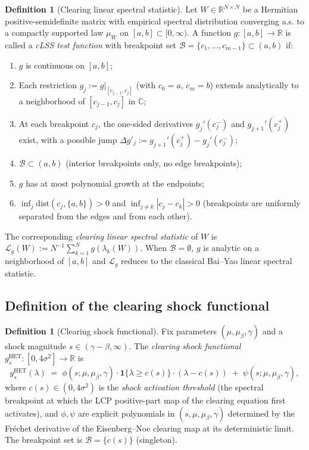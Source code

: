 \documentclass[11pt,a4paper]{article}
\theoremstyle{definition}
\newtheorem{definition}[theorem]{Definition}
\newcommand{\Lcal}{\mathcal{L}}
\newcommand{\Bcal}{\mathcal{B}}
\newcommand{\HET}{\mathrm{HET}}
\newcommand{\indic}{\mathbf{1}}
\begin{document}
\begin{definition}[Clearing linear spectral statistic]
\label{def:cLSS}
Let $W\in\mathbb{R}^{N\times N}$ be a Hermitian positive-semidefinite matrix
with empirical spectral distribution converging a.s. to a compactly supported
law $\mu_W$ on $[a,b]\subset[0,\infty)$. A function $g:[a,b]\to\mathbb{R}$ is
called a \emph{cLSS test function} with breakpoint set
$\Bcal = \{c_1,\dots,c_{m-1}\}\subset(a,b)$ if:
\begin{enumerate}[label={\rm(C\arabic*)},leftmargin=2em]
\item $g$ is continuous on $[a,b]$;
\item Each restriction $g_j := g|_{[c_{j-1},c_j]}$ (with $c_0 = a$, $c_m = b$)
   extends analytically to a neighborhood of $[c_{j-1},c_j]$ in $\mathbb{C}$;
\item At each breakpoint $c_j$, the one-sided derivatives
   $g_j'(c_j^-)$ and $g_{j+1}'(c_j^+)$ exist, with a possible jump
   $\Delta g'_j := g_{j+1}'(c_j^+) - g_j'(c_j^-)$;
\item $\Bcal\subset(a,b)$ (interior breakpoints only, no edge breakpoints);
\item $g$ has at most polynomial growth at the endpoints;
\item $\inf_{j}\mathrm{dist}(c_j,\{a,b\})>0$ and
   $\inf_{j\neq k}|c_j - c_k|>0$ (breakpoints are uniformly separated from
   the edges and from each other).
\end{enumerate}
The corresponding \emph{clearing linear spectral statistic} of $W$ is
$\Lcal_g(W) := N^{-1}\sum_{k=1}^N g(\lambda_k(W))$. When $\Bcal = \emptyset$,
$g$ is analytic on a neighborhood of $[a,b]$ and $\Lcal_g$ reduces to the
classical Bai--Yao linear spectral statistic.
\end{definition}

\subsection{Definition of the clearing shock functional}

\begin{definition}[Clearing shock functional]
\label{def:clearing-shock}
Fix parameters $(\mu,\mu_\beta,\gamma)$ and a shock magnitude
$s\in(\gamma-\beta,\infty)$. The \emph{clearing shock functional}
$g_s^{\HET}:[0,4\sigma^2]\to\mathbb{R}$ is
\[
g_s^{\HET}(\lambda)\;=\;\phi(s;\mu,\mu_\beta,\gamma)\cdot\indic\{\lambda\geq c(s)\}\cdot(\lambda - c(s))\;+\;\psi(s;\mu,\mu_\beta,\gamma),
\]
where $c(s)\in(0,4\sigma^2)$ is the \emph{shock activation threshold} (the
spectral breakpoint at which the LCP positive-part map of the clearing
equation first activates), and $\phi,\psi$ are explicit polynomials in
$(s,\mu,\mu_\beta,\gamma)$ determined by the Fr\'echet derivative of the
Eisenberg--Noe clearing map at its deterministic limit. The breakpoint set is
$\Bcal = \{c(s)\}$ (singleton).
\end{definition}
\end{document}
